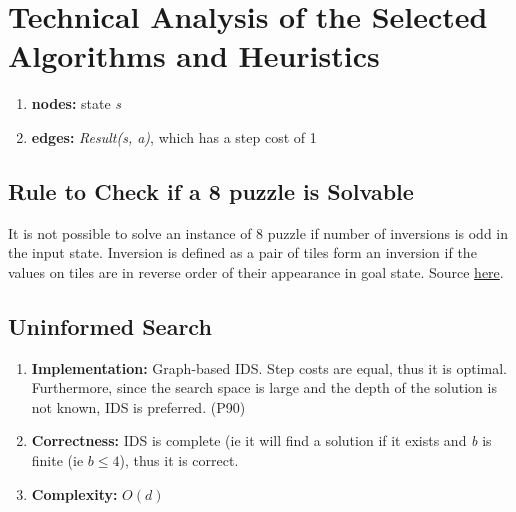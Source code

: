 \documentclass[runningheads]{llncs}
\begin{document}
\section{Technical Analysis of the Selected Algorithms and Heuristics}
\begin{enumerate}
    \item \textbf{nodes:} state \textit{s}
    \item \textbf{edges:} \textit{Result(s, a)}, which has a step cost of 1
\end{enumerate}

\subsection{Rule to Check if a 8 puzzle is Solvable}
It is not possible to solve an instance of 8 puzzle if number of inversions is odd in the input state. 
Inversion is defined as a pair of tiles form an inversion if the values on tiles are in reverse order of their appearance in goal state. Source \href{https://www.geeksforgeeks.org/check-instance-8-puzzle-solvable/}{here}.

\subsection{Uninformed Search}
\begin{enumerate}
    \item \textbf{Implementation:} Graph-based IDS. Step costs are equal, thus it is optimal. Furthermore, since the search space is large and the depth of the solution is not known, IDS is preferred. (P90)
    \item \textbf{Correctness:} IDS is complete (ie it will find a solution if it exists and \textit{b} is finite (ie \( b \leq 4 \)), thus it is correct.
    \item \textbf{Complexity:} \( O(d) \)
\end{enumerate}

\end{document}
